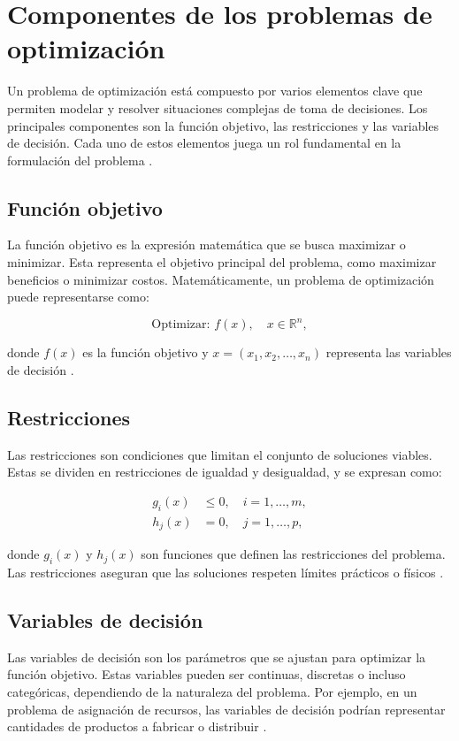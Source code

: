 \section{Componentes de los problemas de optimización}

Un problema de optimización está compuesto por varios elementos clave que permiten modelar y resolver situaciones complejas de toma de decisiones. Los principales componentes son la función objetivo, las restricciones y las variables de decisión. Cada uno de estos elementos juega un rol fundamental en la formulación del problema \cite{nocedal1999optimization}.

\subsection{Función objetivo}
La función objetivo es la expresión matemática que se busca maximizar o minimizar. Esta representa el objetivo principal del problema, como maximizar beneficios o minimizar costos. Matemáticamente, un problema de optimización puede representarse como:

\begin{equation}
	\text{Optimizar: } f(x), \quad x \in \mathbb{R}^n,
\end{equation}

donde \(f(x)\) es la función objetivo y \(x = (x_1, x_2, \dots, x_n)\) representa las variables de decisión \cite{boyd2004convex}.

\subsection{Restricciones}
Las restricciones son condiciones que limitan el conjunto de soluciones viables. Estas se dividen en restricciones de igualdad y desigualdad, y se expresan como:

\begin{align}
	g_i(x) &\leq 0, \quad i = 1, \dots, m, \label{eq:inequality} \\
	h_j(x) &= 0, \quad j = 1, \dots, p, \label{eq:equality}
\end{align}

donde \(g_i(x)\) y \(h_j(x)\) son funciones que definen las restricciones del problema. Las restricciones aseguran que las soluciones respeten límites prácticos o físicos \cite{nocedal1999optimization}.

\subsection{Variables de decisión}
Las variables de decisión son los parámetros que se ajustan para optimizar la función objetivo. Estas variables pueden ser continuas, discretas o incluso categóricas, dependiendo de la naturaleza del problema. Por ejemplo, en un problema de asignación de recursos, las variables de decisión podrían representar cantidades de productos a fabricar o distribuir \cite{boyd2004convex}.

